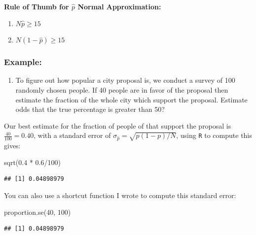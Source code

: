 \documentclass[
]{book}
\newenvironment{Shaded}{\begin{snugshade}}{\end{snugshade}}
\newcommand{\DecValTok}[1]{\textcolor[rgb]{0.00,0.00,0.81}{#1}}
\newcommand{\FloatTok}[1]{\textcolor[rgb]{0.00,0.00,0.81}{#1}}
\newcommand{\FunctionTok}[1]{\textcolor[rgb]{0.00,0.00,0.00}{#1}}
\newcommand{\NormalTok}[1]{#1}
\newcommand{\SpecialCharTok}[1]{\textcolor[rgb]{0.00,0.00,0.00}{#1}}
\providecommand{\tightlist}{%
  \setlength{\itemsep}{0pt}\setlength{\parskip}{0pt}}
\theoremstyle{definition}
\theoremstyle{definition}
\theoremstyle{definition}
\theoremstyle{definition}
\theoremstyle{remark}
\begin{document}
\textbf{Rule of Thumb for \(\hat{p}\) Normal Approximation: }

\begin{enumerate}
\def\labelenumi{\arabic{enumi}.}
\item
  \(N\hat{p}\geq 15\)
\item
  \(N(1-\hat{p})\geq15\)
\end{enumerate}

\hypertarget{example}{%
\subsubsection{Example:}\label{example}}

\begin{enumerate}
\def\labelenumi{\arabic{enumi}.}
\tightlist
\item
  To figure out how popular a city proposal is, we conduct a survey of 100 randomly chosen people. If 40 people are in favor of the proposal then estimate the fraction of the whole city which support the proposal. Estimate odds that the true percentage is greater than 50?
\end{enumerate}

Our best estimate for the fraction of people of that support the proposal is \(\frac{40}{100}=0.40\), with a standard error of \(\sigma_{\hat{p}}=\sqrt{p(1-p)/N}\), using \texttt{R} to compute this gives:

\begin{Shaded}
\begin{Highlighting}[]
\FunctionTok{sqrt}\NormalTok{(}\FloatTok{0.4} \SpecialCharTok{*} \FloatTok{0.6}\SpecialCharTok{/}\DecValTok{100}\NormalTok{)}
\end{Highlighting}
\end{Shaded}

\begin{verbatim}
## [1] 0.04898979
\end{verbatim}

You can also use a shortcut function I wrote to compute this standard error:

\begin{Shaded}
\begin{Highlighting}[]
\FunctionTok{proportion.se}\NormalTok{(}\DecValTok{40}\NormalTok{, }\DecValTok{100}\NormalTok{)}
\end{Highlighting}
\end{Shaded}

\begin{verbatim}
## [1] 0.04898979
\end{verbatim}
\end{document}
